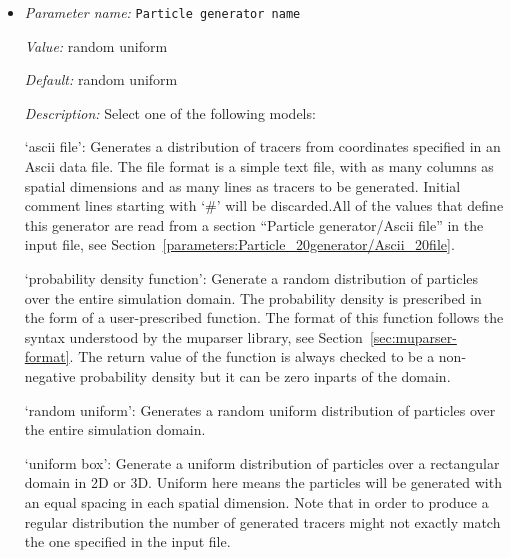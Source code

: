 \begin{itemize}
{\it Value:} 1000


{\it Default:} 1000


{\it Description:} Total number of tracers to create (not per processor or per element). The number is parsed as a floating point number (so that one can specify, for example, '1e4' particles) but it is interpreted as an integer, of course.


{\it Possible values:} [Double 0...1.79769e+308 (inclusive)]
\item {\it Parameter name:} {\tt Particle generator name}
\label{parameters:Postprocess/Tracers/Particle generator name}


{\it Value:} random uniform


{\it Default:} random uniform


{\it Description:} Select one of the following models:

`ascii file': Generates a distribution of tracers from coordinates specified in an Ascii data file. The file format is a simple text file, with as many columns as spatial dimensions and as many lines as tracers to be generated. Initial comment lines starting with `#' will be discarded.All of the values that define this generator are read from a section ``Particle generator/Ascii file'' in the input file, see Section~\ref{parameters:Particle_20generator/Ascii_20file}.

`probability density function': Generate a random distribution of particles over the entire simulation domain. The probability density is prescribed in the form of a user-prescribed function. The format of this function follows the syntax understood by the muparser library, see Section~\ref{sec:muparser-format}. The return value of the function is always checked to be a non-negative probability density but it can be zero inparts of the domain.

`random uniform': Generates a random uniform distribution of particles over the entire simulation domain.

`uniform box': Generate a uniform distribution of particles over a rectangular domain in 2D or 3D. Uniform here means the particles will be generated with an equal spacing in each spatial dimension. Note that in order to produce a regular distribution the number of generated tracers might not exactly match the one specified in the input file.


\end{itemize}
